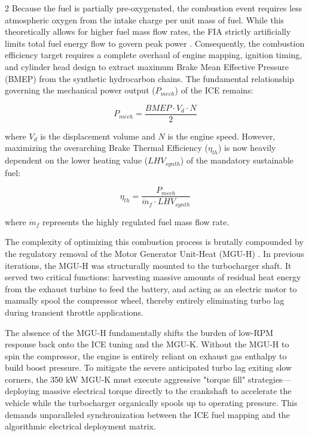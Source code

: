 \begin{multicols}{2}
Because the fuel is partially pre-oxygenated, the combustion event requires less atmospheric oxygen from the intake charge per unit mass of fuel. While this theoretically allows for higher fuel mass flow rates, the FIA strictly artificially limits total fuel energy flow to govern peak power \cite{FIA_2026_PU_Regulations}. Consequently, the combustion efficiency target requires a complete overhaul of engine mapping, ignition timing, and cylinder head design to extract maximum Brake Mean Effective Pressure (BMEP) from the synthetic hydrocarbon chains. The fundamental relationship governing the mechanical power output ($P_{mech}$) of the ICE remains:

\begin{equation}
P_{mech} = \frac{BMEP \cdot V_d \cdot N}{2}
\end{equation}

where $V_d$ is the displacement volume and $N$ is the engine speed. However, maximizing the overarching Brake Thermal Efficiency ($\eta_{th}$) is now heavily dependent on the lower heating value ($LHV_{synth}$) of the mandatory sustainable fuel:

\begin{equation}
\eta_{th} = \frac{P_{mech}}{\dot{m}_f \cdot LHV_{synth}}
\end{equation}

where $\dot{m}_f$ represents the highly regulated fuel mass flow rate.

The complexity of optimizing this combustion process is brutally compounded by the regulatory removal of the Motor Generator Unit-Heat (MGU-H) \cite{FIA_2026_PU_Regulations}. In previous iterations, the MGU-H was structurally mounted to the turbocharger shaft. It served two critical functions: harvesting massive amounts of residual heat energy from the exhaust turbine to feed the battery, and acting as an electric motor to manually spool the compressor wheel, thereby entirely eliminating turbo lag during transient throttle applications.

The absence of the MGU-H fundamentally shifts the burden of low-RPM response back onto the ICE tuning and the MGU-K. Without the MGU-H to spin the compressor, the engine is entirely reliant on exhaust gas enthalpy to build boost pressure. To mitigate the severe anticipated turbo lag exiting slow corners, the 350 kW MGU-K must execute aggressive "torque fill" strategies—deploying massive electrical torque directly to the crankshaft to accelerate the vehicle while the turbocharger organically spools up to operating pressure. This demands unparalleled synchronization between the ICE fuel mapping and the algorithmic electrical deployment matrix.


\end{multicols}
